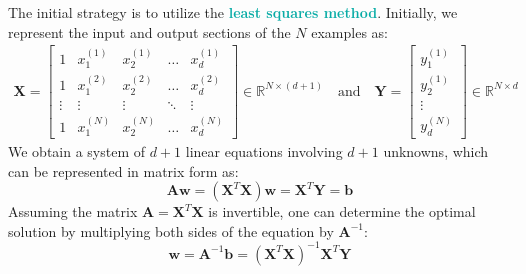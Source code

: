 \documentclass[twoside]{article}
\newcommand{\highlightbluetext}[1]{\textcolor[HTML]{09ACA6}{\textbf{#1}}}
\numberwithin{equation}{section}
\begin{document}
	The initial strategy is to utilize the \highlightbluetext{least squares method}. Initially, we represent the input and output sections of the $N$ examples as:
	\begin{align*}
		\mathbf{X} = \begin{bmatrix}
			1 & x_1^{(1)} & x_2^{(1)} & \ldots & x_d^{(1)} \\
			1 & x_1^{(2)} & x_2^{(2)} & \ldots & x_d^{(2)} \\
			\vdots & \vdots & \vdots & \ddots & \vdots \\
			1 & x_1^{(N)} & x_2^{(N)} & \ldots & x_d^{(N)}
		\end{bmatrix} \in \mathbb{R}^{N \times (d + 1)} \quad \text{and} \quad
		\mathbf{Y} = \begin{bmatrix}
			y_1^{(1)} \\
			y_2^{(1)} \\
			\vdots \\
			y_d^{(N)}
		\end{bmatrix} \in \mathbb{R}^{N \times d}
	\end{align*}
	We obtain a system of $d + 1$ linear equations involving $d + 1$ unknowns, which can be represented in matrix form as:
	\begin{equation}
	\label{eq:MultiOutputRegressionMatrixForm}
	\boxed{\mathbf{Aw} = (\mathbf{X}^T \mathbf{X}) \mathbf{w} = \mathbf{X}^T \mathbf{Y} = \mathbf{b}}
	\end{equation}
	Assuming the matrix $\mathbf{A} = \mathbf{X}^T \mathbf{X}$ is invertible, one can determine the optimal solution by multiplying both sides of the equation by $\mathbf{A}^{-1}$:
	\begin{equation}
	\label{eq:MultiOutputRegressionOptimalSolution}
	\boxed{\mathbf{w} = \mathbf{A}^{-1} \mathbf{b} = (\mathbf{X}^T \mathbf{X})^{-1} \mathbf{X}^T \mathbf{Y}}
	\end{equation}
\end{document}
